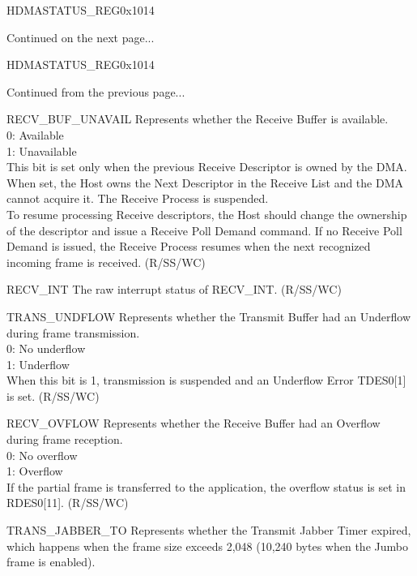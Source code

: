 \begin{register}{H}{DMASTATUS\_REG}{0x1014}
\begin{regdesc}
\begin{reglist}
\item [Continued on the next page...]
\end{reglist}\end{regdesc}
\end{register}

\addtocounter{Regfloat}{-1}
\begin{register}{H}{DMASTATUS\_REG}{0x1014}
\begin{regdesc}\begin{reglist}\item [Continued from the previous page...]


\item [RECV\_BUF\_UNAVAIL] Represents whether the Receive Buffer is available.\\
0: Available\\
1: Unavailable\\
This bit is set only when the previous Receive Descriptor is owned by the DMA.\\
When set, the Host owns the Next Descriptor in the Receive List and the DMA cannot acquire it. The Receive Process is suspended. \\
To resume processing Receive descriptors, the Host should change the ownership of the descriptor and issue a Receive Poll Demand command. If no Receive Poll Demand is issued, the Receive Process resumes when the next recognized incoming frame is received. (R/SS/WC)
\item [RECV\_INT] The raw interrupt status of RECV\_INT. (R/SS/WC)
\item [TRANS\_UNDFLOW] Represents whether the Transmit Buffer had an Underflow during frame transmission.\\
0: No underflow\\
1: Underflow\\
When this bit is 1, transmission is suspended and an Underflow Error TDES0[1] is set. (R/SS/WC)
\item [RECV\_OVFLOW] Represents whether the Receive Buffer had an Overflow during frame reception.\\
0: No overflow\\
1: Overflow\\
If the partial frame is transferred to the application, the overflow status is set in RDES0[11]. (R/SS/WC)
\item [TRANS\_JABBER\_TO] Represents whether the Transmit Jabber Timer expired, which happens when the frame size exceeds 2,048 (10,240 bytes when the Jumbo frame is enabled).\\

\end{reglist}
\end{regdesc}
\end{register}
